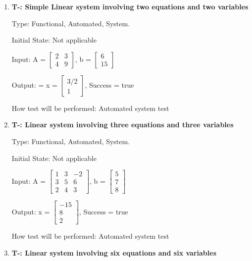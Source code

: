 \documentclass[12pt, titlepage]{article}
\newcounter{tnum}
\begin{document}
\begin{enumerate}

\item{\textbf{T-\thetnum \label{t-gauss
elimination_simple}: Simple Linear system involving two equations and two
variables}}


Type: Functional, Automated, System.
					
Initial State: Not applicable
					
Input: A = $\begin{bmatrix} 
2 & 3 \\
4 & 9 
\end{bmatrix}$, b = $\begin{bmatrix} 
6 \\
15 
\end{bmatrix}$

Output: = x = $\begin{bmatrix} 
3/2\\
1
\end{bmatrix}$, Success = true
					
How test will be performed: Automated system test
					
\item{\textbf{T-\thetnum \label{t-gaussian
elimination_three}: Linear system involving three equations and three
variables}}

Type: Functional, Automated, System.
					
Initial State: Not applicable
					
Input: A =  $\begin{bmatrix} 
1 & 3 & -2 \\
3 & 5 & 6\\
2 & 4 & 3
\end{bmatrix}$, b = $\begin{bmatrix} 
5\\
7\\
8 
\end{bmatrix}$
					
Output: x = $\begin{bmatrix} 
-15\\
8\\
2 
\end{bmatrix}$, Success = true
					
How test will be performed: Automated system test

\item{\textbf{T-\thetnum \label{t-gaussian
elimination_five}: Linear system involving six equations and six variables}}


\end{enumerate}
\end{document}
